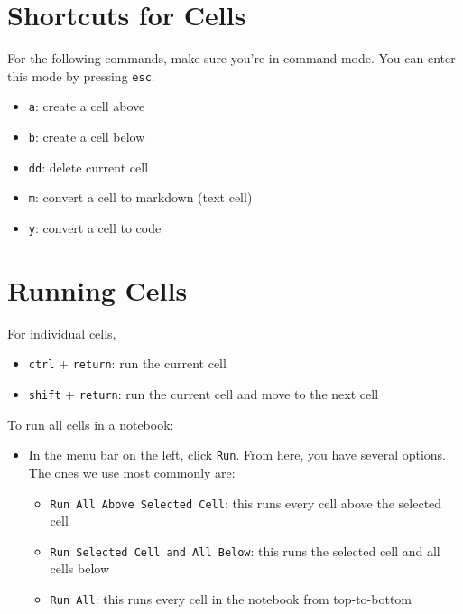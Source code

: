 \documentclass[
  letterpaper,
  DIV=11,
  numbers=noendperiod]{scrreprt}
\providecommand{\tightlist}{%
  \setlength{\itemsep}{0pt}\setlength{\parskip}{0pt}}\usepackage{longtable,booktabs,array}
\begin{document}
\section{Shortcuts for Cells}\label{shortcuts-for-cells}

For the following commands, make sure you're in command mode. You can
enter this mode by pressing \texttt{esc}.

\begin{itemize}
\tightlist
\item
  \texttt{a}: create a cell above
\item
  \texttt{b}: create a cell below
\item
  \texttt{dd}: delete current cell
\item
  \texttt{m}: convert a cell to markdown (text cell)
\item
  \texttt{y}: convert a cell to code
\end{itemize}

\section{Running Cells}\label{running-cells}

For individual cells,

\begin{itemize}
\tightlist
\item
  \texttt{ctrl} + \texttt{return}: run the current cell
\item
  \texttt{shift} + \texttt{return}: run the current cell and move to the
  next cell
\end{itemize}

To run all cells in a notebook:

\begin{itemize}
\item
  In the menu bar on the left, click \texttt{Run}. From here, you have
  several options. The ones we use most commonly are:

  \begin{itemize}
  \tightlist
  \item
    \texttt{Run\ All\ Above\ Selected\ Cell}: this runs every cell above
    the selected cell
  \item
    \texttt{Run\ Selected\ Cell\ and\ All\ Below}: this runs the
    selected cell and all cells below
  \item
    \texttt{Run\ All}: this runs every cell in the notebook from
    top-to-bottom
  \end{itemize}
\end{itemize}
\end{document}

